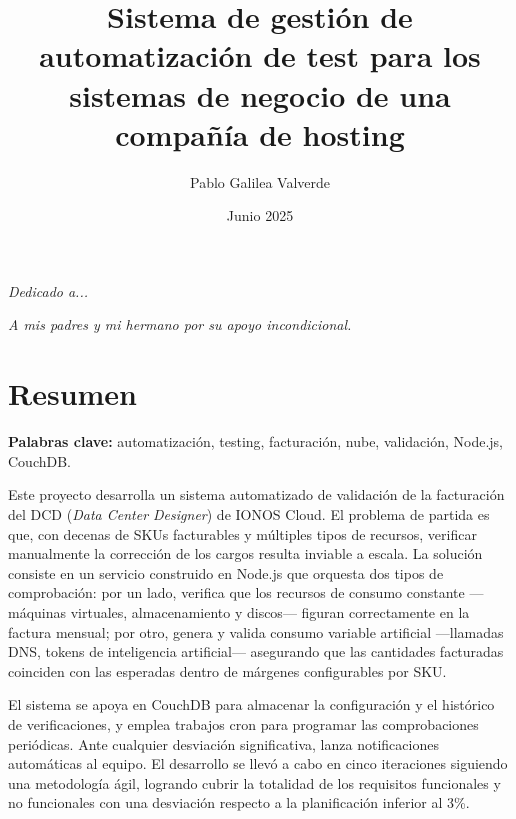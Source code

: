 \documentclass[a4paper,11pt,twoside]{report}
\title{Sistema de gestión de automatización de test para los sistemas de negocio de una compañía de hosting}
\author{Pablo Galilea Valverde}
\date{Junio 2025}
\begin{document}


\clearpage  %
\thispagestyle{empty}
\begin{center}
  \vspace*{5cm}  %

  \textit{Dedicado a...}

  \vspace{2cm}

  \textit{A mis padres y mi hermano por su apoyo incondicional.} \\ %

  \vspace{2cm}   %
\end{center}
\clearpage  %

\setcounter{page}{3}  %

\chapter*{Resumen}
\thispagestyle{empty}  %

\textbf{Palabras clave:} automatización, testing, facturación, nube, validación, Node.js, CouchDB.

\vspace{0.5cm}

Este proyecto desarrolla un sistema automatizado de validación de la facturación del DCD (\textit{Data Center Designer}) de IONOS Cloud. El problema de partida es que, con decenas de SKUs facturables y múltiples tipos de recursos, verificar manualmente la corrección de los cargos resulta inviable a escala. La solución consiste en un servicio construido en Node.js que orquesta dos tipos de comprobación: por un lado, verifica que los recursos de consumo constante —máquinas virtuales, almacenamiento y discos— figuran correctamente en la factura mensual; por otro, genera y valida consumo variable artificial —llamadas DNS, tokens de inteligencia artificial— asegurando que las cantidades facturadas coinciden con las esperadas dentro de márgenes configurables por SKU.

El sistema se apoya en CouchDB para almacenar la configuración y el histórico de verificaciones, y emplea trabajos cron para programar las comprobaciones periódicas. Ante cualquier desviación significativa, lanza notificaciones automáticas al equipo. El desarrollo se llevó a cabo en cinco iteraciones siguiendo una metodología ágil, logrando cubrir la totalidad de los requisitos funcionales y no funcionales con una desviación respecto a la planificación inferior al 3\%.
\end{document}
